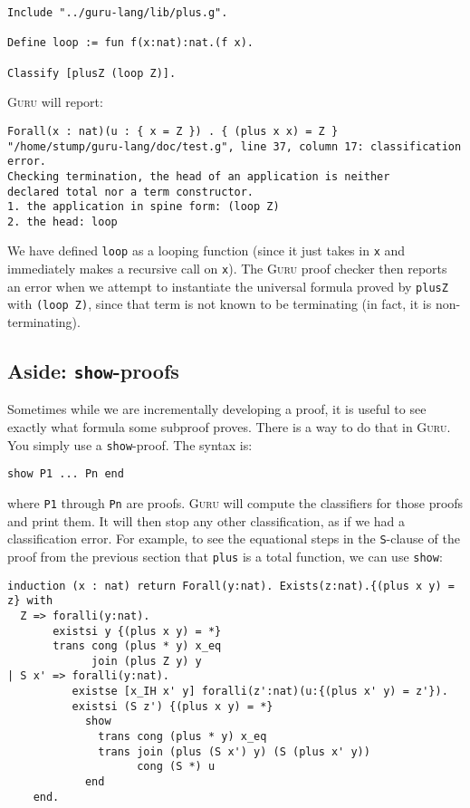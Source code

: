 \documentclass{book}[12pt]
\newcommand{\guru}[0]{\textsc{Guru}\xspace}
\begin{document}
\begin{verbatim}
Include "../guru-lang/lib/plus.g".

Define loop := fun f(x:nat):nat.(f x).

Classify [plusZ (loop Z)].
\end{verbatim}

\noindent \guru will report:

\begin{verbatim}
Forall(x : nat)(u : { x = Z }) . { (plus x x) = Z }
"/home/stump/guru-lang/doc/test.g", line 37, column 17: classification error.
Checking termination, the head of an application is neither
declared total nor a term constructor.
1. the application in spine form: (loop Z)
2. the head: loop
\end{verbatim}

\noindent We have defined \texttt{loop} as a looping function (since
it just takes in \texttt{x} and immediately makes a recursive call on
\texttt{x}).  The \guru proof checker then reports an error when we
attempt to instantiate the universal formula proved by \texttt{plusZ}
with \texttt{(loop Z)}, since that term is not known to be terminating
(in fact, it is non-terminating).

\subsection{Aside: \texttt{show}-proofs}

Sometimes while we are incrementally developing a proof, it is useful
to see exactly what formula some subproof proves.  There is a way to
do that in \guru.  You simply use a \texttt{show}-proof.  The syntax
is:

\begin{verbatim}
show P1 ... Pn end
\end{verbatim}

\noindent where \texttt{P1} through \texttt{Pn} are proofs.  \guru will compute
the classifiers for those proofs and print them.  It will then stop any other
classification, as if we had a classification error.  For example, to see
the equational steps in the \texttt{S}-clause of the proof from the
previous section that \texttt{plus} is a total function, we can use \texttt{show}:

\begin{verbatim}
induction (x : nat) return Forall(y:nat). Exists(z:nat).{(plus x y) = z} with
  Z => foralli(y:nat).
       existsi y {(plus x y) = *}
       trans cong (plus * y) x_eq
             join (plus Z y) y
| S x' => foralli(y:nat).
          existse [x_IH x' y] foralli(z':nat)(u:{(plus x' y) = z'}). 
          existsi (S z') {(plus x y) = *}  
            show
              trans cong (plus * y) x_eq
              trans join (plus (S x') y) (S (plus x' y))
                    cong (S *) u
            end
	end. 
\end{verbatim}
\end{document}
